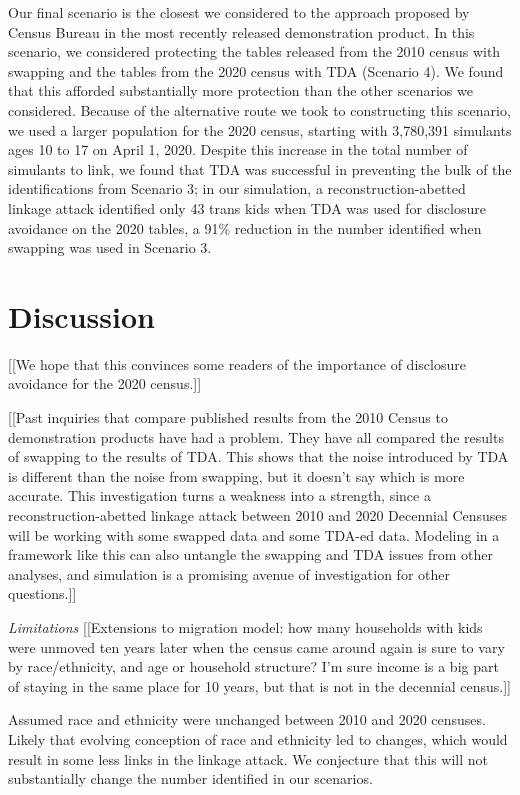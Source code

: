 \documentclass{jpc} %
\theoremstyle{plain}\newtheorem{satz}[thm]{Satz} %
\begin{document}
Our final scenario is the closest we considered to the approach proposed by Census Bureau in the most recently released demonstration product. In this scenario, we considered protecting the tables released from the 2010 census with swapping and the tables from the 2020 census with TDA (Scenario 4).  We found that this afforded substantially more protection than the other scenarios we considered.  Because of the alternative route we took to constructing this scenario, we used a larger population for the 2020 census, starting with 3,780,391 simulants ages 10 to 17 on April 1, 2020.  Despite this increase in the total number of simulants to link, we found that TDA was successful in preventing the bulk of the identifications from Scenario 3; in our simulation, a reconstruction-abetted linkage attack identified only 43 trans kids when TDA was used for disclosure avoidance on the 2020 tables, a 91\% reduction in the number identified when swapping was used in Scenario 3.

\section{Discussion}

[[We hope that this convinces some readers of the importance of disclosure avoidance for the 2020 census.]]

[[Past inquiries that compare published results from the 2010 Census to demonstration products have had a problem.  They have all compared the results of swapping to the results of TDA.  This shows that the noise introduced by TDA is different than the noise from swapping, but it doesn't say which is more accurate.  This investigation turns a weakness into a strength, since a reconstruction-abetted linkage attack between 2010 and 2020 Decennial Censuses will be working with some swapped data and some TDA-ed data.  Modeling in a framework like this can also untangle the swapping and TDA issues from other analyses, and simulation is a promising avenue of investigation for other questions.]]

\emph{Limitations}
[[Extensions to migration model: how many households with kids were unmoved ten years later when the census came around again is sure to vary by race/ethnicity, and age or household structure?  I'm sure income is a big part of staying in the same place for 10 years, but that is not in the decennial census.]]

Assumed race and ethnicity were unchanged between 2010 and 2020 censuses. Likely that evolving conception of race and ethnicity led to changes, which would result in some less links in the linkage attack.  We conjecture that this will not substantially change the number identified in our scenarios.
\end{document}

